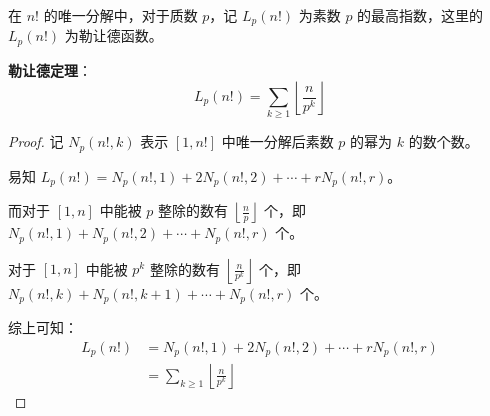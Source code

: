 在 $n!$ 的唯一分解中，对于质数 $p$，记 $L_p(n!)$ 为素数 $p$ 的最高指数，这里的 $L_p(n!)$ 为勒让德函数。

\textbf{勒让德定理}：
\[
L_p(n!) = \sum_{k \ge 1}\left\lfloor\frac{n}{p^k}\right\rfloor
\]

\begin{proof}\leavevmode

记 $N_p(n!, k)$ 表示 $[1, n!]$ 中唯一分解后素数 $p$ 的幂为 $k$ 的数个数。

易知 $L_p(n!) = N_p(n!, 1) + 2N_p(n!, 2) + \cdots + rN_p(n!, r)$。

而对于 $[1, n]$ 中能被 $p$ 整除的数有 $\left\lfloor\frac{n}{p}\right\rfloor$ 个，即 $N_p(n!, 1) + N_p(n!, 2) + \cdots + N_p(n!, r)$ 个。

对于 $[1, n]$ 中能被 $p^k$ 整除的数有 $\left\lfloor\frac{n}{p^k}\right\rfloor$ 个，即 $N_p(n!, k) + N_p(n!, k+1) + \cdots + N_p(n!, r)$ 个。

综上可知：
\[
\begin{aligned}
L_p(n!) &= N_p(n!, 1) + 2N_p(n!, 2) + \cdots + rN_p(n!, r)\\
&= \sum_{k \ge 1}\left\lfloor\frac{n}{p^k}\right\rfloor
\end{aligned}
\]

\end{proof}